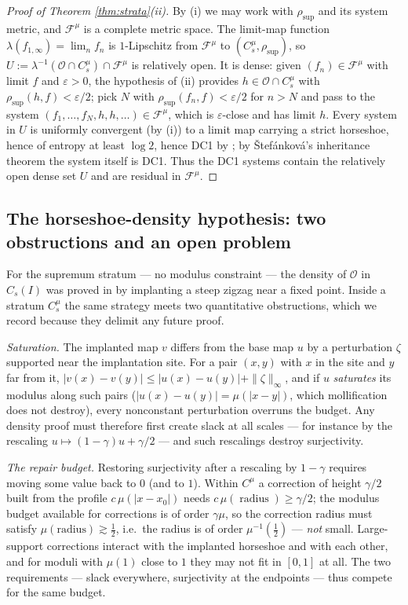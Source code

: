 ﻿\documentclass[11pt]{article}
\newcommand{\I}{I}
\newcommand{\Cs}{C_s(\I)}
\newcommand{\rsup}{\rho_{\sup}}
\newcommand{\lm}{\lambda}
\begin{document}
\begin{proof}[Proof of Theorem \ref{thm:strata}(ii)]
By (i) we may work with $\rsup$ and its system metric, and $\mathcal F^\mu$ is a
complete metric space.  The limit-map function
$\lm(f_{1,\infty})=\lim_nf_n$ is $1$-Lipschitz from $\mathcal F^\mu$ to
$(C^\mu_s,\rsup)$, so
$U:=\lm^{-1}(\mathcal O\cap C^\mu_s)\cap\mathcal F^\mu$ is relatively open.
It is dense: given $(f_n)\in\mathcal F^\mu$ with limit $f$ and
$\varepsilon>0$, the hypothesis of (ii) provides
$h\in\mathcal O\cap C^\mu_s$ with $\rsup(h,f)<\varepsilon/2$; pick $N$ with
$\rsup(f_n,f)<\varepsilon/2$ for $n>N$ and pass to the system
$(f_1,\dots,f_N,h,h,\dots)\in\mathcal F^\mu$, which is $\varepsilon$-close and
has limit $h$.  Every system in $U$ is uniformly convergent (by (i)) to a limit
map carrying a strict horseshoe, hence of entropy at least $\log2$, hence DC1 by
\cite{SS}; by \v Stef\'ankov\'a's inheritance theorem \cite{Stefankova} the
system itself is DC1.  Thus the DC1 systems contain the relatively open dense
set $U$ and are residual in $\mathcal F^\mu$.
\end{proof}

\subsection*{The horseshoe-density hypothesis: two obstructions and an open
problem}

For the supremum stratum --- no modulus constraint --- the density of
$\mathcal O$ in $\Cs$ was proved in \cite{companion} by implanting a steep
zigzag near a fixed point.  Inside a stratum $C^\mu_s$ the same strategy meets
two quantitative obstructions, which we record because they delimit any future
proof.

\emph{Saturation.}  The implanted map $v$ differs from the base map $u$ by a
perturbation $\zeta$ supported near the implantation site.  For a pair $(x,y)$
with $x$ in the site and $y$ far from it,
$|v(x)-v(y)|\le|u(x)-u(y)|+\|\zeta\|_\infty$, and if $u$ \emph{saturates} its
modulus along such pairs ($|u(x)-u(y)|=\mu(|x-y|)$, which mollification does not
destroy), every nonconstant perturbation overruns the budget.  Any density proof
must therefore first create slack at all scales --- for instance by the
rescaling $u\mapsto(1-\gamma)u+\gamma/2$ --- and such rescalings destroy
surjectivity.

\emph{The repair budget.}  Restoring surjectivity after a rescaling by
$1-\gamma$ requires moving some value back to $0$ (and to $1$).  Within
$C^\mu$ a correction of height $\gamma/2$ built from the profile
$c\,\mu(|x-x_0|)$ needs $c\,\mu(\operatorname{radius})\ge\gamma/2$; the modulus
budget available for corrections is of order $\gamma\mu$, so the correction
radius must satisfy $\mu(\mathrm{radius})\gtrsim\tfrac12$, i.e.\ the radius is
of order $\mu^{-1}(\tfrac12)$ --- \emph{not} small.  Large-support corrections
interact with the implanted horseshoe and with each other, and for moduli with
$\mu(1)$ close to $1$ they may not fit in $[0,1]$ at all.  The two requirements
--- slack everywhere, surjectivity at the endpoints --- thus compete for the
same budget.
\end{document}
